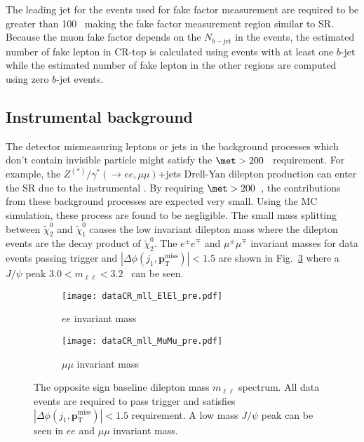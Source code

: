 The leading jet \pt for the events used for fake factor measurement are required to be greater than 100~{\GeV} making the fake factor measurement region similar to SR.
Because the muon fake factor depends on the $N_{b-\mathrm{jet}}$ in the events, the estimated number of fake lepton in CR-top is calculated using events with at least one $b$-jet while the estimated number of fake lepton in the other regions are computed using zero $b$-jet events.


\subsection{Instrumental \met background}
\label{subsec:bkg_instrumental_met_background}
The detector mismeasuring leptons or jets in the background processes which don't contain invisible particle might satisfy the $\met > 200$~{\GeV} requirement.
For example, the $Z^{(*)}/\gamma^{*}(\to ee, \mu \mu)$+jets Drell-Yan dilepton production can enter the SR due to the instrumental \met.
By requiring $\met > 200$~{\GeV}, the contributions from these background processes are expected very small.
Using the MC simulation, these process are found to be negligible.
The small mass splitting between $\widetilde{\chi}^{0}_{2}$ and $\widetilde{\chi}^{0}_{1}$ causes the low invariant dilepton mass where the dilepton events are the decay product of $\widetilde{\chi}^{0}_{2}$.
The $e^{\pm} e^{\mp}$ and $\mu^{\pm} \mu^{\mp}$ invariant masses for data events passing \met trigger and $|\Delta \phi(j_{1}, \mathbf{p}_\mathrm{T}^\mathrm{miss})| < 1.5$ are shown in Fig.~\ref{fig:bkg_invariant_mass} where a $J/\psi$ peak $3.0 < m_{\ell \ell} < 3.2$~{\GeV} can be seen.

\begin{figure}[ht]
    \begin{center}
        \begin{subfigure}[b]{0.48\textwidth}
            \texttt{[image: dataCR\_mll\_ElEl\_pre.pdf]}
            \caption{$ee$ invariant mass}
            \label{fig:bkg_ee_invariant_mass}
        \end{subfigure}
        \begin{subfigure}[b]{0.48\textwidth}
            \texttt{[image: dataCR\_mll\_MuMu\_pre.pdf]}
            \caption{$\mu \mu$ invariant mass}
            \label{fig:bkg_mumu_invariant_mass}
        \end{subfigure}
        \caption{The opposite sign baseline dilepton mass $m_{\ell \ell}$ spectrum.
        All data events are required to pass \met trigger and satisfies $|\Delta \phi(j_{1}, \mathbf{p}_\mathrm{T}^\mathrm{miss})| < 1.5$ requirement.
        A low mass $J/\psi$ peak can be seen in $ee$ and $\mu \mu$ invariant mass.}
        \label{fig:bkg_invariant_mass}
    \end{center}
\end{figure}

